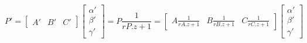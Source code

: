 \documentclass{article}
\begin{document}
\thispagestyle{empty}

$$
P' = \begin{bmatrix}A' & B' & C'\end{bmatrix} \begin{bmatrix}\alpha'\\ \beta'\\ \gamma'\end{bmatrix}=
P\frac{1}{rP.z+1} =  \begin{bmatrix}A\frac{1}{rA.z+1} & B\frac{1}{rB.z+1} & C\frac{1}{rC.z+1}\end{bmatrix} \begin{bmatrix}\alpha'\\ \beta'\\ \gamma'\end{bmatrix}
$$
\end{document}

